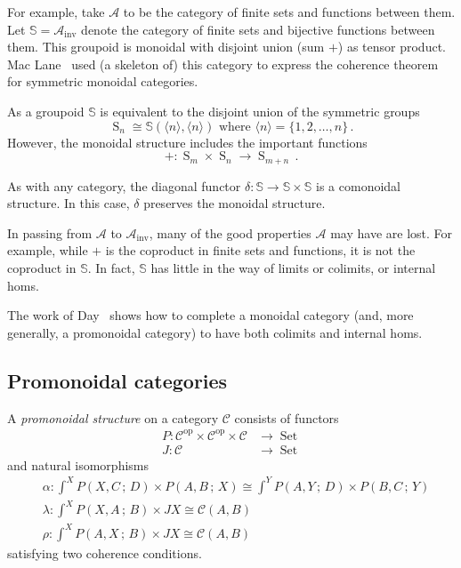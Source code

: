 \documentclass[a4paper,12pt]{article}
\theoremstyle{definition}
\theoremstyle{fact}
\theoremstyle{genquest}
\theoremstyle{step}
\newcommand{\catA}{\mathcal{A}}
\newcommand{\catC}{\mathcal{C}}
\newcommand{\LieS}{\operatorname{S}\nolimits}
\newcommand{\catSS}{\mathbb{S}}
\newcommand{\Set}{\operatorname{Set}}
\newcommand{\inv}{\mathrm{inv}}
\newcommand{\op}{\operatorname{op}}
\newcommand{\longto}{\longrightarrow}
\begin{document}
For example, take $\catA$ to be the category of finite sets and functions between them.  Let $\catSS=\catA_{\inv}$  denote the category of finite sets and bijective functions between them.   This groupoid is monoidal with disjoint union (sum $+$) as tensor product.  Mac Lane~\cite{ML1963} used (a skeleton of) this category to express the coherence theorem for symmetric monoidal categories.

As a groupoid $\catSS$ is equivalent to the disjoint union of the symmetric groups
\[
\LieS_n \cong \catSS (\langle n \rangle , \langle n \rangle) \text{ where } \langle n \rangle = \{1,2,\ldots,n\}\,.
\]
However, the monoidal structure includes the important functions
\[
+ : \LieS_m \times \LieS_n  \longto \LieS_{m+n}\,.
\]

As with any category, the diagonal functor $\delta : \catSS \to \catSS \times \catSS$ is a comonoidal structure.   
In this case, $\delta$ preserves the monoidal structure.

In passing from $\catA$ to $\catA_{\inv}$, many of the good properties $\catA$ may have are lost.    
For example, while $+$ is the coproduct in finite sets and functions, it is not the coproduct in $\catSS$.    
In fact, $\catSS$ has little in the way of limits or colimits, or internal homs.


The work of Day~\cite{DayConv} shows how to complete a monoidal category 
(and, more generally, a promonoidal category) to have both colimits and internal homs.

\subsection{Promonoidal categories\label{Promon}}

A \emph{promonoidal structure} on a category $\catC$ consists of functors
\begin{align*}
P : \catC^{\op} \times \catC^{\op} \times \catC &\longto \Set 
\\
J : \catC &\longto \Set 
\end{align*}
and natural isomorphisms
\begin{align*}
&\alpha : \int^X P (X,C\,;\,D) \times P(A,B\,;\,X) \cong \int^Y P(A,Y\,;\,D) \times P (B,C\,;\,Y)
\\
&\lambda : \int^X P(X,A\,;\,B) \times JX \cong \catC (A,B)
\\
&\rho : \int^X P (A,X\,;\,B) \times JX \cong \catC(A,B)
\end{align*}
satisfying two coherence conditions.
\end{document}
